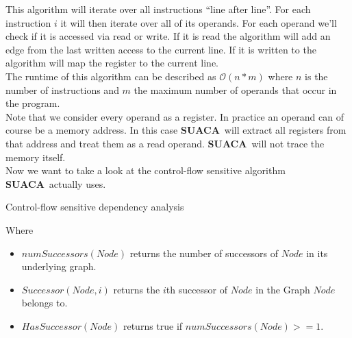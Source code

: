 \documentclass[a4paper,12pt,titlepage, twoside]{report}
\newcommand{\suaca}{\textbf{SUACA}}
\begin{document}
This algorithm will iterate over all instructions ``line after line''. For each instruction $i$ it will then iterate over all of its operands. For each operand we'll check if it is accessed via read or write. If it is read the algorithm will add an edge from the last written access to the current line. If it is written to the algorithm will map the register to the current line.\\

The runtime of this algorithm can be described as $\mathcal{O}(n*m)$ where $n$ is the number of instructions and $m$ the maximum number of operands that occur in the program.\\

Note that we consider every operand as a register. In practice an operand can of course be a memory address. In this case \suaca\ will extract all registers from that address and treat them as a read operand. \suaca\ will not trace the memory itself.\\

Now we want to take a look at the control-flow sensitive algorithm \suaca\ actually uses. 

\begin{algorithm}[H]
    \SetAlgoLined
    \caption{Control-flow sensitive dependency analysis}
\end{algorithm}

Where
\begin{itemize}
    \item $numSuccessors(Node)$ returns the number of successors of $Node$ in its underlying graph.
    \item $Successor(Node, i)$ returns the $i$th successor of $Node$ in the Graph $Node$ belongs to.
    \item $HasSuccessor(Node)$ returns true if $numSuccessors(Node) >= 1$.
\end{itemize}
\end{document}
